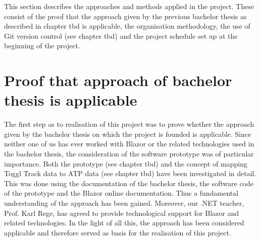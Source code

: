 
This section describes the approaches and methods applied in the project. These consist of the proof that the
approach given by the previous bachelor thesis as described in chapter tbd is applicable, the organisation methodology,
the use of Git version control (see chapter tbd) and the project schedule set up at the beginning of the project.

\section{Proof that approach of bachelor thesis is applicable}
The first step as to realisation of this project was to prove whether the approach given by the bachelor thesis
on which the project is founded is applicable. Since neither one of us has ever worked with Blazor or the 
related technologies used in the bachelor thesis, the consideration of the software prototype was of particular
importance. Both the prototype (see chapter tbd) and the concept of mapping Toggl Track data to ATP data (see
chapter tbd) have been investigated in detail. This was done using the documentation of the bachelor thesis,
the software code of the prototype and the Blazor online documentation. Thus a fundamental understanding of the
approach has been gained. Moreover, our .NET teacher, Prof. Karl Rege, has agreed to provide technological support 
for Blazor and related technologies. In the light of all this, the approach has been considered applicable and
therefore served as basis for the realisation of this project.
